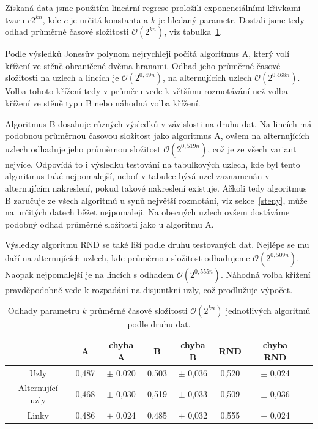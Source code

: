 Získaná data jsme použitím lineární regrese proložili exponenciálními křivkami tvaru $c 2^{kn}$, kde $c$ je určitá  konstanta a $k$ je hledaný parametr. Dostali jsme tedy odhad průměrné časové složitosti $\mathcal{O}(2^{kn})$, viz tabulka~\ref{datatab}.

Podle výsledků Jonesův polynom nejrychleji počítá algoritmus A, který volí křížení ve stěně ohraničené dvěma hranami. Odhad jeho průměrné časové složitosti na uzlech a lincích je $\mathcal{O}(2^{0,49n})$, na alternujících uzlech $\mathcal{O}(2^{0.468 n})$. Volba tohoto křížení tedy v průměru vede k většímu rozmotávání než volba křížení ve stěně typu B nebo náhodná volba křížení. 

Algoritmus B dosahuje různých výsledků v závislosti na druhu dat. Na lincích má podobnou průměrnou časovou složitost jako algoritmus A, ovšem na alternujících uzlech odhaduje jeho průměrnou složitost $\mathcal{O}(2^{0,519 n})$, což je ze všech variant nejvíce. Odpovídá to i výsledku testování na tabulkových uzlech, kde byl tento algoritmus také nejpomalejší, neboť v tabulce bývá uzel zaznamenán v alternujícím nakreslení, pokud takové nakreslení existuje. Ačkoli tedy algoritmus B zaručuje ze všech algoritmů u synů největší rozmotání, viz sekce~\ref{steny}, může na určitých datech běžet nejpomaleji. Na obecných uzlech ovšem dostáváme podobný odhad průměrné složitosti jako u algoritmu A.

Výsledky algoritmu RND se také liší podle druhu testovaných dat. Nejlépe se mu daří na alternujících uzlech, kde průměrnou složitost odhadujeme $\mathcal{O}(2^{0,509 n})$. Naopak nejpomalejší je na lincích s odhadem $\mathcal{O}(2^{0,555 n})$. Náhodná volba křížení pravděpodobně vede k rozpadání na disjuntkní uzly, což prodlužuje výpočet.

\begin{table}[t]
\centering
  \begin{tabular}{*{8}{c}}
    \toprule
       & A & chyba A & B & chyba B &  RND & chyba RND \\ 
    \midrule
    Uzly  & 0,487 & $\pm$ 0,020  &   0,503 & $\pm$ 0,036   &  0,520 & $\pm$ 0,024\\
    Alternující uzly & 0,468  & $\pm$ 0,030 &  0,519 & $\pm$  0,033 & 0,509 & $\pm$ 0,036\\
    Linky  & 0,486 &  $\pm$ 0,024 &   0,485 & $\pm$  0,032  &   0,555 & $\pm$ 0,024\\
    \bottomrule
  \end{tabular}
    \caption{Odhady parametru $k$ průměrné časové složitosti $\mathcal{O}(2^{kn})$ jednotlivých algoritmů podle druhu dat.} \label{datatab}

\end{table} 



